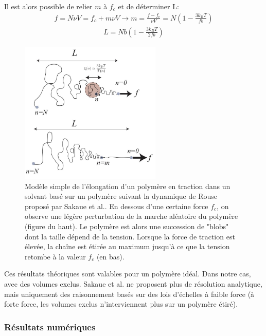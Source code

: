 Il est alors possible de relier $m$ à $f_c$ et de déterminer L:
\begin{eqnarray}
f=  N\nu V = f_c + m\nu V \rightarrow m= \frac{f-f_c}{\nu V} = N\left(1-\frac{3k_BT}{fb}\right)
\end{eqnarray}
\begin{eqnarray}
L= Nb\left(1-\frac{3k_BT}{2
fb}\right)
\label{fc}
\end{eqnarray}



\begin{figure}[H]
\begin{center}
\includegraphics[width=0.6\textwidth]{sakauetraction.jpg}
\caption[Traction d'un polymère]{Modèle simple de l'élongation d'un polymère en traction dans un solvant basé sur un polymère suivant la dynamique de Rouse proposé par Sakaue et al.\cite{Sakaue2012}. En dessous d'une certaine force $f_c$, on observe une légère perturbation de la marche aléatoire du polymère (figure du haut). Le polymère est alors une succession de "blobs" dont la taille dépend de la tension. Lorsque la force de traction est élevée, la chaîne est étirée au maximum jusqu'à ce que la tension retombe à la valeur $f_c$ (en bas).}
\label{sakauetraction}
\end{center}
\end{figure}

Ces résultats théoriques sont valables pour un polymère idéal. Dans notre cas, avec des volumes exclus. Sakaue et al. \cite{Sakaue2012} ne proposent plus de résolution analytique, mais uniquement des raisonnement basés sur des lois d'échelles à faible force (à forte force, les volumes exclus n'interviennent plus sur un polymère étiré).

\subsubsection{Résultats numériques}

